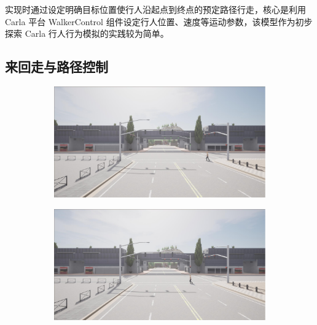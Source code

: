 实现时通过设定明确目标位置使行人沿起点到终点的预定路径行走，核心是利用 Carla 平台 WalkerControl 组件设定行人位置、速度等运动参数，该模型作为初步探索 Carla 行人行为模拟的实践较为简单。

\subsection{来回走与路径控制}

\begin{figure}[H]
    \centering
    \begin{minipage}{\textwidth}
        \centering
        \begin{subfigure}{0.48\textwidth}
            \includegraphics[width=\textwidth]{images/crossing_walking1.pdf}
        \end{subfigure}
        \begin{subfigure}{0.48\textwidth}
            \includegraphics[width=\textwidth]{images/crossing_walking2.pdf}
        \end{subfigure}

        \vspace{0.3cm}


\end{minipage}
\end{figure}
